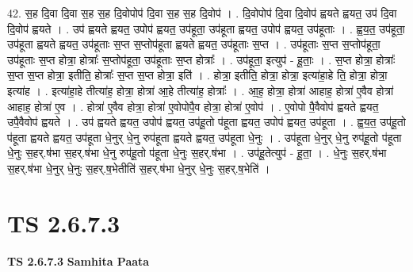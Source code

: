 \documentclass[17pt]{extarticle}
\begin{document}
42. स॒ह दि॒वा दि॒वा स॒ह स॒ह दि॒वोपोप॑ दि॒वा स॒ह स॒ह दि॒वोप॑ । . दि॒वोपोप॑ दि॒वा दि॒वोप॑ ह्वयते ह्वयत॒ उप॑ दि॒वा दि॒वोप॑ ह्वयते । . उप॑ ह्वयते ह्वयत॒ उपोप॑ ह्वयत॒ उप॑हूता॒ उप॑हूता ह्वयत॒ उपोप॑ ह्वयत॒ उप॑हूताः । . ह्व॒य॒त॒ उप॑हूता॒ उप॑हूता ह्वयते ह्वयत॒ उप॑हूताः स॒प्त स॒प्तोप॑हूता ह्वयते ह्वयत॒ उप॑हूताः स॒प्त । . उप॑हूताः स॒प्त स॒प्तोप॑हूता॒ उप॑हूताः स॒प्त होत्रा॒ होत्राः᳚ स॒प्तोप॑हूता॒ उप॑हूताः स॒प्त होत्राः᳚ । . उप॑हूता॒ इत्युप॑ - हू॒ताः॒ । . स॒प्त होत्रा॒ होत्राः᳚ स॒प्त स॒प्त होत्रा॒ इतीति॒ होत्राः᳚ स॒प्त स॒प्त होत्रा॒ इति॑ । . होत्रा॒ इतीति॒ होत्रा॒ होत्रा॒ इत्या॑हा॒हे ति॒ होत्रा॒ होत्रा॒ इत्या॑ह । . इत्या॑हा॒हे तीत्या॑ह॒ होत्रा॒ होत्रा॑ आ॒हे तीत्या॑ह॒ होत्राः᳚ । . आ॒ह॒ होत्रा॒ होत्रा॑ आहाह॒ होत्रा॑ ए॒वैव होत्रा॑ आहाह॒ होत्रा॑ ए॒व । . होत्रा॑ ए॒वैव होत्रा॒ होत्रा॑ ए॒वोपोपै॒व होत्रा॒ होत्रा॑ ए॒वोप॑ । . ए॒वोपो पै॒वैवोप॑ ह्वयते ह्वयत॒ उपै॒वैवोप॑ ह्वयते । . उप॑ ह्वयते ह्वयत॒ उपोप॑ ह्वयत॒ उप॑हू॒तो प॑हूता ह्वयत॒ उपोप॑ ह्वयत॒ उप॑हूता । . ह्व॒य॒त॒ उप॑हू॒तो प॑हूता ह्वयते ह्वयत॒ उप॑हूता धे॒नुर् धे॒नु रुप॑हूता ह्वयते ह्वयत॒ उप॑हूता धे॒नुः । . उप॑हूता धे॒नुर् धे॒नु रुप॑हू॒तो प॑हूता धे॒नुः स॒हर्.ष॑भा स॒हर्.ष॑भा धे॒नु रुप॑हू॒तो प॑हूता धे॒नुः स॒हर्.ष॑भा । . उप॑हू॒तेत्युप॑ - हू॒ता॒ । . धे॒नुः स॒हर्.ष॑भा स॒हर्.ष॑भा धे॒नुर् धे॒नुः स॒हर्.ष॒भेतीति॑ स॒हर्.ष॑भा धे॒नुर् धे॒नुः स॒हर्.ष॒भेति॑ । \newline
\pagebreak
{}

\section{ TS 2.6.7.3 }

\textbf{TS 2.6.7.3 } \newline
\textbf{Samhita Paata} \newline
\end{document}
